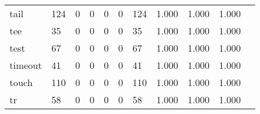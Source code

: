 \begin{longtable}{lp{1.2cm}p{1.2cm}p{1.2cm}p{1.2cm}p{1.2cm}p{1.2cm}p{1.2cm}p{1.2cm}p{1.2cm}p{1.2cm}}
tail      &                                   124 &                                                  0 &                                                  0 &                                                  0 &                                                  0 &                                                124 &                                         1.000 &                                              1.000 &                                              1.000 \\
tee       &                                    35 &                                                  0 &                                                  0 &                                                  0 &                                                  0 &                                                 35 &                                         1.000 &                                              1.000 &                                              1.000 \\
test      &                                    67 &                                                  0 &                                                  0 &                                                  0 &                                                  0 &                                                 67 &                                         1.000 &                                              1.000 &                                              1.000 \\
timeout   &                                    41 &                                                  0 &                                                  0 &                                                  0 &                                                  0 &                                                 41 &                                         1.000 &                                              1.000 &                                              1.000 \\
touch     &                                   110 &                                                  0 &                                                  0 &                                                  0 &                                                  0 &                                                110 &                                         1.000 &                                              1.000 &                                              1.000 \\
tr        &                                    58 &                                                  0 &                                                  0 &                                                  0 &                                                  0 &                                                 58 &                                         1.000 &                                              1.000 &                                              1.000 \\

\end{longtable}
